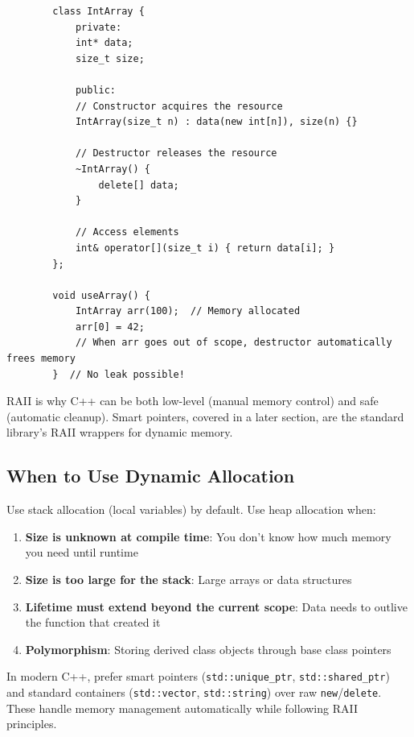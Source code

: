 \begin{example}{\leavevmode}
	
	\begin{lstlisting}
		class IntArray {
			private:
			int* data;
			size_t size;
			
			public:
			// Constructor acquires the resource
			IntArray(size_t n) : data(new int[n]), size(n) {}
			
			// Destructor releases the resource
			~IntArray() {
				delete[] data;
			}
			
			// Access elements
			int& operator[](size_t i) { return data[i]; }
		};
		
		void useArray() {
			IntArray arr(100);  // Memory allocated
			arr[0] = 42;
			// When arr goes out of scope, destructor automatically frees memory
		}  // No leak possible!
	\end{lstlisting}
\end{example}

\begin{remark}
	RAII is why C++ can be both low-level (manual memory control) and safe (automatic cleanup). Smart pointers, covered in a later section, are the standard library's RAII wrappers for dynamic memory.
\end{remark}

\subsection{When to Use Dynamic Allocation}

Use stack allocation (local variables) by default. Use heap allocation when:

\begin{enumerate}
	\item \textbf{Size is unknown at compile time}: You don't know how much memory you need until runtime
	\item \textbf{Size is too large for the stack}: Large arrays or data structures
	\item \textbf{Lifetime must extend beyond the current scope}: Data needs to outlive the function that created it
	\item \textbf{Polymorphism}: Storing derived class objects through base class pointers
\end{enumerate}

\begin{remark}
	In modern C++, prefer smart pointers (\texttt{std::unique\_ptr}, \texttt{std::shared\_ptr}) and standard containers (\texttt{std::vector}, \texttt{std::string}) over raw \texttt{new}/\texttt{delete}. These handle memory management automatically while following RAII principles.
\end{remark}